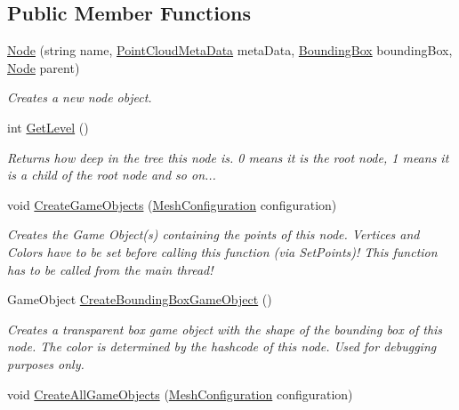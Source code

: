 \subsection*{Public Member Functions}
\begin{DoxyCompactItemize}
\item 
\hyperlink{class_cloud_data_1_1_node_a6540b5d8cb8fc40067560b3c002d574c}{Node} (string name, \hyperlink{class_cloud_data_1_1_point_cloud_meta_data}{Point\+Cloud\+Meta\+Data} meta\+Data, \hyperlink{class_cloud_data_1_1_bounding_box}{Bounding\+Box} bounding\+Box, \hyperlink{class_cloud_data_1_1_node}{Node} parent)
\begin{DoxyCompactList}\small\item\em Creates a new node object. \end{DoxyCompactList}\item 
int \hyperlink{class_cloud_data_1_1_node_af70f14b2486f62d63e1155a1a7d4f34f}{Get\+Level} ()
\begin{DoxyCompactList}\small\item\em Returns how deep in the tree this node is. 0 means it is the root node, 1 means it is a child of the root node and so on... \end{DoxyCompactList}\item 
void \hyperlink{class_cloud_data_1_1_node_a5d81b4c9928dbdc1d204c13feb645da0}{Create\+Game\+Objects} (\hyperlink{class_object_creation_1_1_mesh_configuration}{Mesh\+Configuration} configuration)
\begin{DoxyCompactList}\small\item\em Creates the Game Object(s) containing the points of this node. Vertices and Colors have to be set before calling this function (via Set\+Points)! This function has to be called from the main thread! \end{DoxyCompactList}\item 
Game\+Object \hyperlink{class_cloud_data_1_1_node_a79ada8b9a0cf64c7d23f70b862681f4c}{Create\+Bounding\+Box\+Game\+Object} ()
\begin{DoxyCompactList}\small\item\em Creates a transparent box game object with the shape of the bounding box of this node. The color is determined by the hashcode of this node. Used for debugging purposes only. \end{DoxyCompactList}\item 
void \hyperlink{class_cloud_data_1_1_node_a75101ac753ab2b540c0a1f8e761f79df}{Create\+All\+Game\+Objects} (\hyperlink{class_object_creation_1_1_mesh_configuration}{Mesh\+Configuration} configuration)

\end{DoxyCompactItemize}
